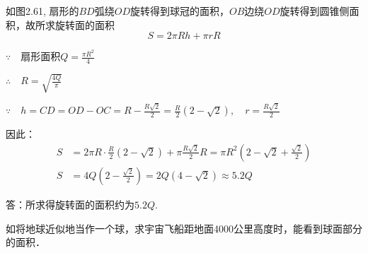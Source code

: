 \begin{solution}
    如图2.61, 扇形的$BD$弧绕$OD$旋转得到球冠的面积，$OB$边绕$OD$旋转得到圆锥侧面积，故所求旋转面的面积
\[S=2\pi Rh+\pi rR\]

$\because\quad \text{扇形面积}Q=\frac{\pi R^2}{4}$

$\therefore\quad R=\sqrt{\frac{4Q}{\pi}}$

$\because\quad h=CD=OD-OC=R-\frac{R\sqrt{2}}{2}=\frac{R}{2}(2-\sqrt{2}),\quad r=\frac{R\sqrt{2}}{2}$

因此：
\[\begin{split}
    S&=2\pi R\cdot \frac{R}{2}\left(2-\sqrt{2}\right)+\pi\frac{R\sqrt{2}}{2}R=\pi R^2\left(2-\sqrt{2}+\frac{\sqrt{2}}{2}\right)\\
    S&=4Q\left(2-\frac{\sqrt{2}}{2}\right)=2Q\left(4-\sqrt{2}\right)\approx 5.2Q
\end{split}\]

答：所求得旋转面的面积约为$5.2Q$.
\end{solution}


  \begin{example}
    如将地球近似地当作一个球，求宇宙飞船距地面4000公里高度时，能看到球面部分的面积．
  \end{example}

\begin{figure}[htp]
    \centering
{}
    \caption{}
\end{figure}

